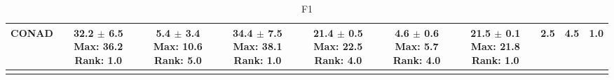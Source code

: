 \begin{longtable}{|l|c|c|c|c|c|c|c|c|c|}
CONAD & \makecell{ 32.2 $\pm$ 6.5 \\ \scriptsize Max: 36.2 \\ \scriptsize Rank: 1.0 } & \makecell{ 5.4 $\pm$ 3.4 \\ \scriptsize Max: 10.6 \\ \scriptsize Rank: 5.0 } & \makecell{ 34.4 $\pm$ 7.5 \\ \scriptsize Max: 38.1 \\ \scriptsize Rank: 1.0 } & \makecell{ 21.4 $\pm$ 0.5 \\ \scriptsize Max: 22.5 \\ \scriptsize Rank: 4.0 } & \makecell{ 4.6 $\pm$ 0.6 \\ \scriptsize Max: 5.7 \\ \scriptsize Rank: 4.0 } & \makecell{ 21.5 $\pm$ 0.1 \\ \scriptsize Max: 21.8 \\ \scriptsize Rank: 1.0 } & 2.5 & 4.5 & 1.0 \\ \hline 
\caption{ F1 } \label{tab:synth_f1}
\end{longtable}
